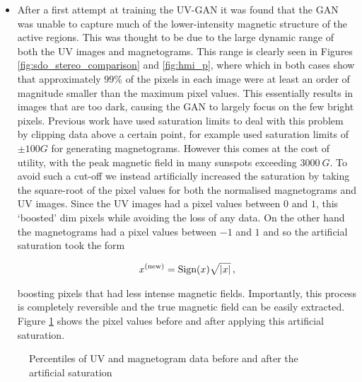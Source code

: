 \documentclass[11pt,a4paper,onecolumn]{report}
\begin{document}
\begin{itemize}
  \item After a first attempt at training the UV-GAN it was found that the GAN
  was unable to capture much of the lower-intensity magnetic structure of the
  active regions. This was thought to be due to the large dynamic range of both
  the UV images and magnetograms. This range is clearly seen in Figures
  \ref{fig:sdo_stereo_comparison} and \ref{fig:hmi_p}, where which in both cases
  show that approximately $99\%$ of the pixels in each image were at least an
  order of magnitude smaller than the maximum pixel values. This essentially
  results in images that are too dark, causing the GAN to largely focus on the
  few bright pixels. Previous work have used saturation limits to deal with this
  problem by clipping data above a certain point, \citet{Kim2019} for example
  used saturation limits of $\pm 100G$ for generating magnetograms. However this
  comes at the cost of utility, with the peak magnetic field in many sunspots
  exceeding $\SI[]{3000}[]{G}$. To avoid such a cut-off we instead artificially
  increased the saturation by taking the square-root of the pixel values for
  both the normalised magnetograms and UV images. Since the UV images had a
  pixel values between $0$ and $1$, this `boosted' dim pixels while
  avoiding the loss of any data. On the other hand the magnetograms had a
  pixel values between $-1$ and $1$ and so the artificial saturation took the form
  
\begin{align}
  x^{(\text{new})} = \text{Sign}(x)\sqrt{\absolutevalue{x}}\, ,
\end{align}

boosting pixels that had less intense magnetic fields. Importantly, this process
is completely reversible and the true magnetic field can be easily extracted.
Figure \ref{fig:artificial_sat} shows the pixel values before and after applying
this artificial saturation. 



\end{itemize}


\begin{figure}[h]
  \centering
  
  \caption{Percentiles of UV and magnetogram data before and after the artificial saturation}
  \label{fig:artificial_sat}
\end{figure}
\end{document}
